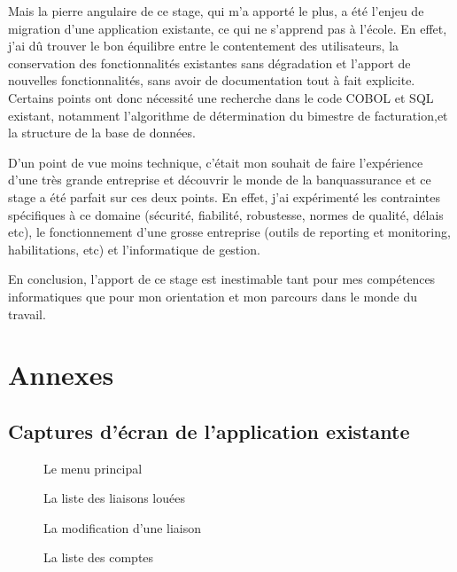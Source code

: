 \documentclass[a4paper,french,8pt]{article}
\begin{document}
		
		Mais la pierre angulaire de ce stage, qui m'a apporté le plus, a été l'enjeu de migration d'une application existante, ce qui ne s'apprend pas à l'école. En effet, j'ai dû trouver le bon équilibre
		entre le contentement des utilisateurs, la conservation des fonctionnalités existantes sans dégradation et l'apport de nouvelles fonctionnalités, sans avoir de documentation tout à fait explicite.
		Certains points ont donc nécessité une recherche dans le code COBOL et SQL existant, notamment l'algorithme de détermination du bimestre de facturation,et la structure de la base de données.
		
		
		D'un point de vue moins technique, c'était mon souhait de faire l'expérience d'une très grande entreprise et découvrir le monde de la banquassurance et ce stage a été parfait sur ces deux points.
		En effet, j'ai expérimenté les contraintes spécifiques à ce domaine (sécurité, fiabilité, robustesse, normes de qualité, délais etc), le fonctionnement d'une grosse entreprise (outils de reporting et monitoring,
		habilitations, etc) et l'informatique de gestion.
		
		En conclusion, l'apport de ce stage est inestimable tant pour mes compétences informatiques que pour mon orientation et mon parcours dans le monde du travail.
	
	

\section{Annexes}
	\subsection{Captures d'écran de l'application existante}
	\newpage
		\begin{figure}[h!]
			\caption{Le menu principal}
			\centering
		\end{figure} 
		
		\begin{figure}[h!]
			\caption{La liste des liaisons louées}
			\centering
		\end{figure}
		
		\begin{figure}[h!]
			\caption{La modification d'une liaison}
			\centering
		\end{figure} 
		
		\begin{figure}[h!]
			\caption{La liste des comptes}
			\centering
		\end{figure} 
\end{document}
